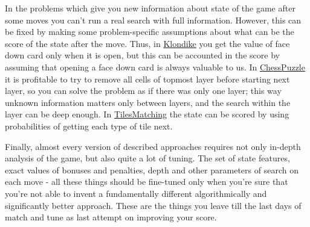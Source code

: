 In the problems which give you new information about state of the game
after some moves you can't run a real search with full information.
However, this can be fixed by making some problem-specific assumptions
about what can be the score of the state after the move. Thus, in
\href{http://www.topcoder.com/longcontest/?module=ViewProblemStatement\&rd=13565\&pm=10014}{Klondike}
you get the value of face down card only when it is open, but this can
be accounted in the score by assuming that opening a face down card is
always valuable to us. In
\href{http://www.topcoder.com/longcontest/?module=ViewProblemStatement\&rd=14196\&pm=10728}{ChessPuzzle}
it is profitable to try to remove all cells of topmost layer before
starting next layer, so you can solve the problem as if there was only
one layer; this way unknown information matters only between layers, and
the search within the layer can be deep enough. In
\href{http://www.topcoder.com/longcontest/?module=ViewProblemStatement\&rd=13795\&pm=10410}{TilesMatching}
the state can be scored by using probabilities of getting each type of
tile next.

Finally, almost every version of described approaches requires not only
in-depth analysis of the game, but also quite a lot of tuning. The set
of state features, exact values of bonuses and penalties, depth and
other parameters of search on each move - all these things should be
fine-tuned only when you're sure that you're not able to invent a
fundamentally different algorithmically and significantly better
approach. These are the things you leave till the last days of match and
tune as last attempt on improving your score.
